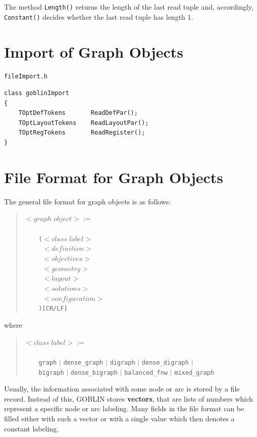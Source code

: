 \documentclass[a4paper,11pt,twoside]{book}
\begin{document}
\begin{multicols}{2}
The method \verb/Length()/ returns the length of the last read tuple and,
accordingly, \verb/Constant()/ decides whether the last read tuple has length
$1$.



\section{Import of Graph Objects}
\myinclude\verb/fileImport.h/
\begin{mymethods}
\begin{verbatim}
class goblinImport
{
    TOptDefTokens       ReadDefPar();
    TOptLayoutTokens    ReadLayoutPar();
    TOptRegTokens       ReadRegister();
}
\end{verbatim}
\end{mymethods}



\newpage
{}
\section{File Format for Graph Objects}
\label{slb_format}
The general file format for graph objects is as follows:
\begin{quote}
$<graph\;object> :=$\verb/    /\\
\verb/    /\\
\verb/    (/$<class\;label>$\\
\verb/     /$<definition>$\\
\verb/     /$<objectives>$\\
\verb/     /$<geometry>$\\
\verb/     /$<layout>$\\
\verb/     /$<solutions>$\\
\verb/     /$<configuration>$\\
\verb!    )[CR/LF]!\\
\end{quote}
where
\begin{quote}
$<class\;label> :=$\verb/    /\\
\verb/    /\\
\verb/    graph/        $|$ \verb/dense_graph/      $|$
\verb/digraph/      $|$ \verb/dense_digraph/    $|$\\
\verb/    bigraph/      $|$ \verb/dense_bigraph/    $|$
\verb/balanced_fnw/ $|$ \verb/mixed_graph/
\end{quote}
Usually, the information associated with some node or arc is stored by a file
record. Instead of this, GOBLIN stores {\bf vectors}, that are lists of numbers
which represent a specific node or arc labeling. Many fields in the file format
can be filled either with such a vector or with a single value which then
denotes a constant labeling.


\end{multicols}
\end{document}
